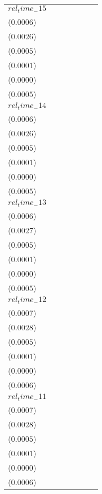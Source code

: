 \begin{tabular}{lllllll}
$rel_time_-15$ & \makecell{$-0.0020^{***}$ \\ ($0.0006$)} & \makecell{$-0.0123^{***}$ \\ ($0.0026$)} & \makecell{$-0.0004^{}$ \\ ($0.0005$)} & \makecell{$0.0001^{}$ \\ ($0.0001$)} & \makecell{$-0.0000^{}$ \\ ($0.0000$)} & \makecell{$-0.0015^{***}$ \\ ($0.0005$)} \\
$rel_time_-14$ & \makecell{$-0.0026^{***}$ \\ ($0.0006$)} & \makecell{$-0.0128^{***}$ \\ ($0.0026$)} & \makecell{$-0.0005^{}$ \\ ($0.0005$)} & \makecell{$0.0000^{}$ \\ ($0.0001$)} & \makecell{$-0.0000^{}$ \\ ($0.0000$)} & \makecell{$-0.0018^{***}$ \\ ($0.0005$)} \\
$rel_time_-13$ & \makecell{$-0.0061^{***}$ \\ ($0.0006$)} & \makecell{$-0.0241^{***}$ \\ ($0.0027$)} & \makecell{$0.0006^{}$ \\ ($0.0005$)} & \makecell{$0.0001^{**}$ \\ ($0.0001$)} & \makecell{$0.0000^{}$ \\ ($0.0000$)} & \makecell{$-0.0046^{***}$ \\ ($0.0005$)} \\
$rel_time_-12$ & \makecell{$-0.0035^{***}$ \\ ($0.0007$)} & \makecell{$-0.0154^{***}$ \\ ($0.0028$)} & \makecell{$0.0008^{}$ \\ ($0.0005$)} & \makecell{$0.0001^{}$ \\ ($0.0001$)} & \makecell{$0.0000^{}$ \\ ($0.0000$)} & \makecell{$-0.0026^{***}$ \\ ($0.0006$)} \\
$rel_time_-11$ & \makecell{$-0.0017^{**}$ \\ ($0.0007$)} & \makecell{$-0.0074^{***}$ \\ ($0.0028$)} & \makecell{$0.0004^{}$ \\ ($0.0005$)} & \makecell{$0.0000^{}$ \\ ($0.0001$)} & \makecell{$0.0000^{}$ \\ ($0.0000$)} & \makecell{$-0.0013^{**}$ \\ ($0.0006$)} \\

\end{tabular}
